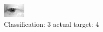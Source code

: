 \begin{figure}[h!]
\begin{center}
\includegraphics[width=0.60\columnwidth]{figures/ID2714_class_3_target_4.png}
\end{center}
\caption{ Classification: 3 actual target: 4}
\label{fig:ID2714_class_3_target_4}
\end{figure}
